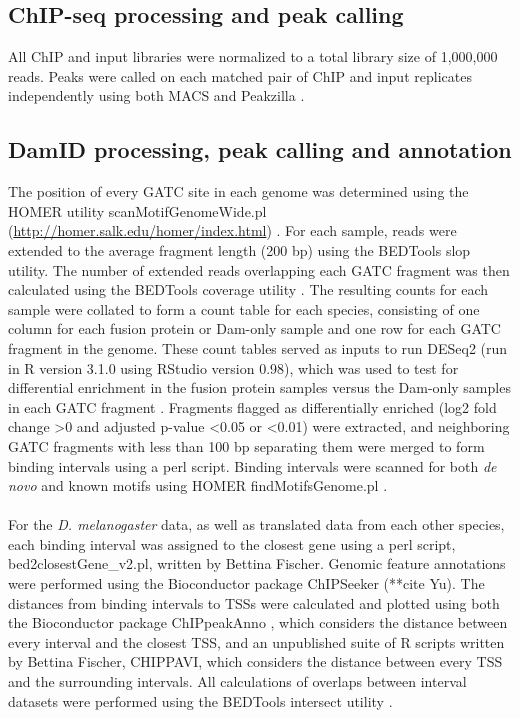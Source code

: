 \subsection{ChIP-seq processing and peak calling}
All ChIP and input libraries were normalized to a total library size of 1,000,000 reads. Peaks were called on each matched pair of ChIP and input replicates independently using both MACS and Peakzilla \citep{bardet_identification_2013, zhang_model-based_2008}.

\subsection{DamID processing, peak calling and annotation}
The position of every GATC site in each genome was determined using the HOMER utility scanMotifGenomeWide.pl (\url{http://homer.salk.edu/homer/index.html}) \citep{heinz_simple_2010}. For each sample, reads were extended to the average fragment length (200 bp) using the BEDTools slop utility. The number of extended reads overlapping each GATC fragment was then calculated using the BEDTools coverage utility \citep{quinlan_bedtools:_2010}. The resulting counts for each sample were collated to form a count table for each species, consisting of one column for each fusion protein or Dam-only sample and one row for each GATC fragment in the genome. These count tables served as inputs to run DESeq2 (run in R version 3.1.0 using RStudio version 0.98), which was used to test for differential enrichment in the fusion protein samples versus the Dam-only samples in each GATC fragment \citep{love_moderated_2014}. Fragments flagged as differentially enriched (log2 fold change \textgreater 0 and adjusted p-value \textless 0.05 or \textless 0.01) were extracted, and neighboring GATC fragments with less than 100 bp separating them were merged to form binding intervals using a perl script. Binding intervals were scanned for both \emph{de novo} and known motifs using HOMER findMotifsGenome.pl \citep{heinz_simple_2010}.
\paragraph{}
For the \emph{D. melanogaster} data, as well as translated data from each other species, each binding interval was assigned to the closest gene using a perl script, bed2closestGene\_v2.pl, written by Bettina Fischer. Genomic feature annotations were performed using the Bioconductor package ChIPSeeker (**cite Yu). The distances from binding intervals to TSSs were calculated and plotted using both the Bioconductor package ChIPpeakAnno \citep{zhu_chippeakanno:_2010}, which considers the distance between every interval and the closest TSS, and an unpublished suite of R scripts written by Bettina Fischer, CHIPPAVI, which considers the distance between every TSS and the surrounding intervals. All calculations of overlaps between interval datasets were performed using the BEDTools intersect utility \citep{quinlan_bedtools:_2010}.

